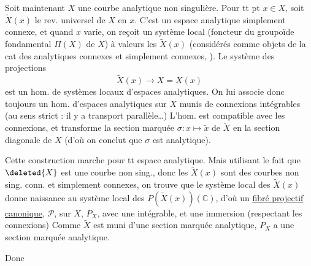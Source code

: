 Soit maintenant $X$ une courbe analytique non singulière. Pour tt pt $x\in X$, soit $\widetilde X(x)$ le rev. universel de $X$ en $x$. C'est un espace analytique simplement connexe, et quand $x$ varie, on reçoit un système local (foncteur du groupoïde fondamental $\Pi(X)$ de $X$) à valeurs les $\widetilde X(x)$ (considérés comme objets de la cat des  analytiques connexes et simplement connexes, ). Le système des projections
\[\widetilde X(x)\longrightarrow X=X(x)\]
est un hom. de systèmes locaux d'espaces analytiques. On lui associe donc toujours un hom. d'espaces analytiques sur $X$
munis de connexions intégrables (au sens strict : il y a transport parallèle\ldots)
L'hom. est compatible avec les connexions, et transforme la section marquée $\sigma:x\mapsto\widetilde x$ de $\widetilde X$ en la section diagonale de $X$ (d'où on conclut que $\sigma$ est analytique).

Cette construction marche pour tt espace analytique. Mais utilisant le fait que $\deleted{X}$ est une courbe non sing., donc les $\widetilde X(x)$ sont des courbes non sing. conn. et simplement connexes, on trouve que le système local des $\widetilde X(x)$ donne naissance au système local des $P(\widetilde X(x))(\mathbb C)$, d'où un \uline{fibré projectif canonique}, $\mathcal P$, sur
$X$, $P_X$, avec une  intégrable, et une immersion  (respectant les connexions)
Comme $\widetilde X$ est muni d'une section marquée analytique, $P_X$ a une section marquée analytique.

Donc

